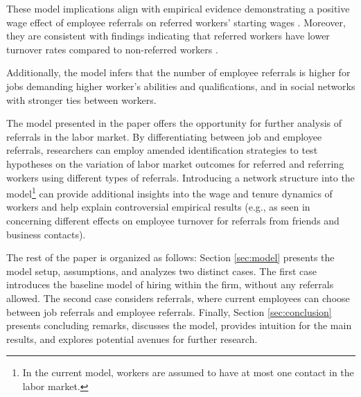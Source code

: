 \documentclass[12pt]{article}
\begin{document}
These model implications align with empirical evidence demonstrating a positive wage effect of employee referrals on referred workers' starting wages \citep{brown2016informal, dustmann2016referral, galenianos2013learning, montgomery1991social, simon1992matchmaker, corcoran1980most}. Moreover, they are consistent with findings indicating that referred workers have lower turnover rates compared to non-referred workers \citep{simon1992matchmaker, dustmann2016referral, brown2016informal}.

Additionally, the model infers that the number of employee referrals is higher for jobs demanding higher worker's abilities and qualifications, and in social networks with stronger ties between workers.


The model presented in the paper offers the opportunity for further analysis of referrals in the labor market. By differentiating between job and employee referrals, researchers can employ amended identification strategies to test hypotheses on the variation of labor market outcomes for referred and referring workers using different types of referrals. Introducing a network structure into the model\footnote{In the current model, workers are assumed to have at most one contact in the labor market.} can provide additional insights into the wage and tenure dynamics of workers and help explain controversial empirical results (e.g., as seen in \cite{lester2021heterogeneous} concerning different effects on employee turnover for referrals from friends and business contacts). 

The rest of the paper is organized as follows: Section \ref{sec:model} presents the model setup, assumptions, and analyzes two distinct cases. The first case introduces the baseline model of hiring within the firm, without any referrals allowed. The second case considers referrals, where current employees can choose between job referrals and employee referrals. Finally, Section \ref{sec:conclusion} presents concluding remarks, discusses the model, provides intuition for the main results, and explores potential avenues for further research.
\end{document}
